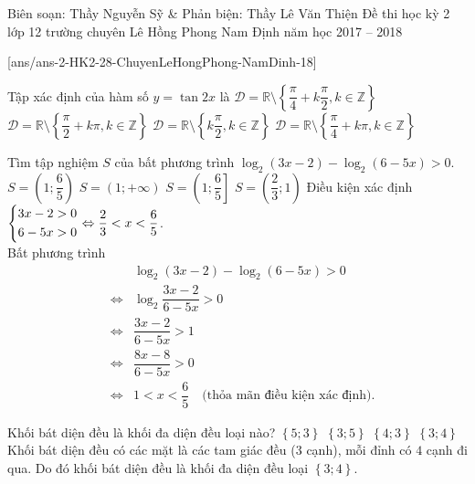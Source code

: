 \begin{name}
{Biên soạn: Thầy Nguyễn Sỹ \& Phản biện: Thầy Lê Văn Thiện}
{Đề thi học kỳ 2 lớp 12 trường chuyên Lê Hồng Phong Nam Định năm học 2017 – 2018}
\end{name}
\setcounter{ex}{0}\setcounter{bt}{0}
[ans/ans-2-HK2-28-ChuyenLeHongPhong-NamDinh-18]
\begin{ex}%
	Tập xác định của hàm số $y= \tan 2x$ là
	\choice
	{\True $\mathscr{D}= \mathbb{R} \setminus \left \{ \dfrac{\pi}{4}+ k \dfrac{\pi}{2}, k \in \mathbb{Z}\right \}$}
	{$\mathscr{D}= \mathbb{R}\setminus \left \{ \dfrac{\pi}{2}+ k \pi, k \in \mathbb{Z}\right \}$}
	{$\mathscr{D}= \mathbb{R}\setminus \left \{ k \dfrac{\pi}{2}, k \in \mathbb{Z}\right \}$}
	{$\mathscr{D}= \mathbb{R}\setminus \left \{ \dfrac{\pi}{4}+ k \pi, k \in \mathbb{Z}\right \}$}
\end{ex} 

\begin{ex}%
	Tìm tập nghiệm $S$ của bất phương trình $\log_2(3x-2)- \log_2(6-5x)>0.$
	\choice
	{\True $S= \left( 1;\dfrac{6}{5}\right)$}
	{$S= (1;+\infty)$}
	{$S=\left(1;\dfrac{6}{5} \right]$}
	{$S=\left(\dfrac{2}{3};1\right)$}
	\loigiai
	{ Điều kiện xác định $\left\{\begin{aligned}& 3x-2 >0\\& 6-5x>0\end{aligned}\right. \Leftrightarrow \dfrac{2}{3} <x< \dfrac{6}{5}$.\\
	  Bất phương trình  
	  \begin{eqnarray*}
	  	& & \log_2(3x-2)- \log_2(6-5x)>0\\
	  	&\Leftrightarrow & \log_2 {\dfrac{3x-2}{6-5x} >0}\\
	  	&\Leftrightarrow & \dfrac{3x-2}{6-5x} >1\\
	  	&\Leftrightarrow & \dfrac{8x -8}{6-5x}>0\\
	  	& \Leftrightarrow & 1<x< \dfrac{6}{5} \quad \text{(thỏa mãn điều kiện xác định).}
	  \end{eqnarray*}	
	}
\end{ex}

\begin{ex}%
	Khối bát diện đều là khối đa diện đều loại nào?
	\choice
	{$\left\{5;3 \right\}$}
	{$\left\{3;5 \right\}$}
	{$\left\{4;3 \right\}$}
	{\True $\left\{3;4 \right\}$}
	\loigiai
	{ Khối bát diện đều có các mặt là các tam giác đều ($3$ cạnh), mỗi đỉnh có $4$ cạnh đi qua. Do đó khối bát diện đều là khối đa diện đều loại $\left\{3;4 \right\}$.
	}
\end{ex}

